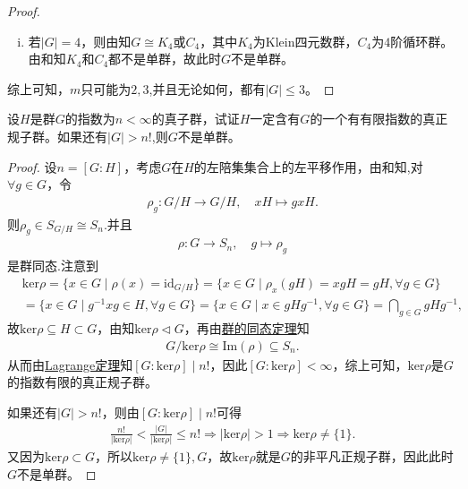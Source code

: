 \documentclass[../../main.tex]{subfiles}%
\begin{document}
\begin{proof}
\begin{enumerate}[(1)]
\begin{enumerate}[(i)]
\item 若$|G|=4$，则由知$G\cong K_4$或$C_4$，其中$K_4$为Klein四元数群，$C_4$为$4$阶循环群。由和知$K_4$和$C_4$都不是单群，故此时$G$不是单群。
\end{enumerate}
\end{enumerate}
综上可知，$m$只可能为$2,3$,并且无论如何，都有$|G|\leqslant 3$。

\end{proof}

\begin{example}
设$H$是群$G$的指数为$n<\infty$的真子群，试证$H$一定含有$G$的一个有有限指数的真正规子群。如果还有$|G|>n!$,则$G$不是单群。
\end{example}
\begin{proof}

设$n=[G:H]$，考虑$G$在$H$的左陪集集合上的左平移作用，由和知,对$\forall g\in G$，令
\begin{align*}
\rho_g:G/H\to G/H,\quad xH\mapsto gxH.
\end{align*}
则$\rho_g\in S_{G/H}\cong S_n$.并且
\begin{align*}
\rho:G\to S_n,\quad g\mapsto \rho_g
\end{align*}
是群同态.注意到
\begin{align*}
&\mathrm{ker}\rho=\{x\in G\mid \rho(x)=\mathrm{id}_{G/H}\}=\{x\in G\mid \rho_x(gH)=xgH=gH,\forall g\in G\}\\
&=\{x\in G\mid g^{-1}xg\in H,\forall g\in G\}=\{x\in G\mid x\in gHg^{-1},\forall g\in G\}=\bigcap\limits_{g\in G}gHg^{-1},
\end{align*}
故$\mathrm{ker}\rho\subseteq H\subset G$，由知$\mathrm{ker}\rho\lhd G$，再由\hyperref[theorem:群的同态基本定理]{群的同态定理}知
\begin{align*}
G/\mathrm{ker}\rho\cong \mathrm{Im}(\rho)\subseteq S_n.
\end{align*}
从而由\hyperref[theorem:抽象代数--Lagrange定理]{Lagrange定理}知$[G:\mathrm{ker}\rho]\mid n!$，因此$[G:\mathrm{ker}\rho]<\infty$，综上可知，$\mathrm{ker}\rho$是$G$的指数有限的真正规子群。

如果还有$|G|>n!$，则由$[G:\mathrm{ker}\rho]\mid n!$可得
\begin{align*}
\frac{n!}{|\mathrm{ker}\rho|}<\frac{|G|}{|\mathrm{ker}\rho|}\leqslant n!\Longrightarrow |\mathrm{ker}\rho|>1\Longrightarrow \mathrm{ker}\rho\neq \{1\}.
\end{align*}
又因为$\mathrm{ker}\rho\subset G$，所以$\mathrm{ker}\rho\neq \{1\},G$，故$\mathrm{ker}\rho$就是$G$的非平凡正规子群，因此此时$G$不是单群。


\end{proof}
\end{document}
